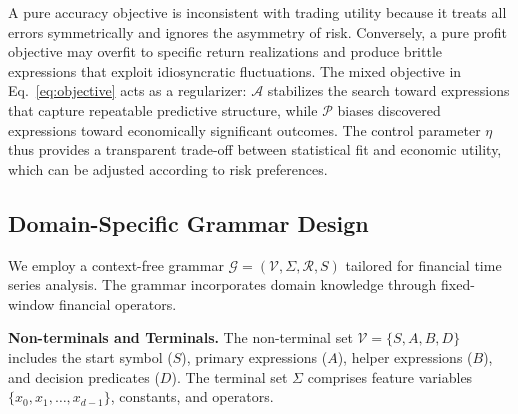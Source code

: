 \documentclass{elektr}
\theoremstyle{corollary}
\theoremstyle{lemma}
\theoremstyle{proposition}
\theoremstyle{axiom}
\theoremstyle{conjecture}
\theoremstyle{example}
\theoremstyle{definition}
\theoremstyle{remark}
\begin{document}
A pure accuracy objective is inconsistent with trading utility because it treats all errors symmetrically and ignores the asymmetry of risk. Conversely, a pure profit objective may overfit to specific return realizations and produce brittle expressions that exploit idiosyncratic fluctuations. The mixed objective in Eq.~\ref{eq:objective} acts as a regularizer: $\mathcal{A}$ stabilizes the search toward expressions that capture repeatable predictive structure, while $\mathcal{P}$ biases discovered expressions toward economically significant outcomes. The control parameter $\eta$ thus provides a transparent trade-off between statistical fit and economic utility, which can be adjusted according to risk preferences.

\subsection{Domain-Specific Grammar Design}
\label{subsec:grammar}

We employ a context-free grammar $\mathcal{G} = (\mathcal{V}, \Sigma, \mathcal{R}, \mathit{S})$ tailored for financial time series analysis. The grammar incorporates domain knowledge through fixed-window financial operators.

\textbf{Non-terminals and Terminals.} The non-terminal set $\mathcal{V} = \{\mathit{S}, \mathit{A}, \mathit{B}, \mathit{D}\}$ includes the start symbol ($\mathit{S}$), primary expressions ($\mathit{A}$), helper expressions ($\mathit{B}$), and decision predicates ($\mathit{D}$). The terminal set $\Sigma$ comprises feature variables $\{x_0, x_1, \ldots, x_{d-1}\}$, constants, and operators.
\end{document}
